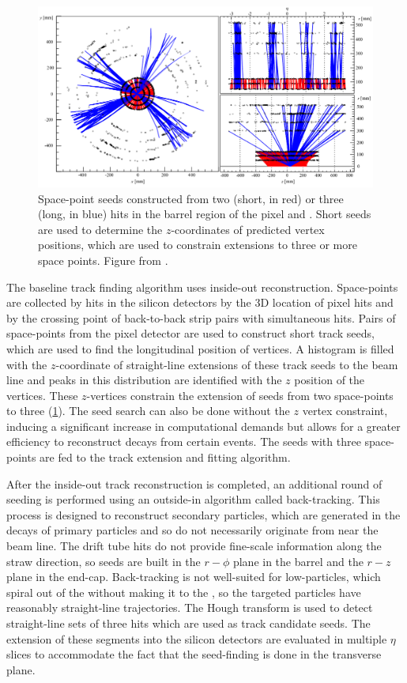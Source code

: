 \begin{figure}[t]
  \includegraphics[width=\linewidth]{soft-pub-2007-007_sp_seeds.png}
  \caption{Space-point seeds constructed from two (short, in red) or three (long, in blue) hits in the barrel region of the pixel and \sct. Short seeds are used to determine the $z$-coordinates of predicted vertex positions, which are used to constrain extensions to three or more space points.  Figure from .}
  \label{fig:trk_seeds}
\end{figure}

The baseline track finding algorithm uses inside-out reconstruction.
Space-points are collected by hits in the silicon detectors by the 3D location of pixel hits and by the crossing point of back-to-back \sct strip pairs with simultaneous hits.
Pairs of space-points from the pixel detector are used to construct short track seeds, which are used to find the longitudinal position of vertices.
A histogram is filled with the $z$-coordinate of straight-line extensions of these track seeds to the beam line and peaks in this distribution are identified with the $z$ position of the vertices.
These $z$-vertices constrain the extension of seeds from two space-points to three (\cref{fig:trk_seeds}).
The seed search can also be done without the $z$ vertex constraint, inducing a significant increase in computational demands but allows for a greater efficiency to reconstruct decays from certain events.
The seeds with three space-points are fed to the track extension and fitting algorithm.

After the inside-out track reconstruction is completed, an additional round of seeding is performed using an outside-in algorithm called back-tracking.
This process is designed to reconstruct secondary particles, which are generated in the decays of primary particles and so do not necessarily originate from near the beam line.
The \trt drift tube hits do not provide fine-scale information along the straw direction, so seeds are built in the $r - \phi$ plane in the \trt barrel and the $r - z$ plane in the \trt end-cap.
Back-tracking is not well-suited for low-\pt particles, which spiral out of the \id without making it to the \trt, so the targeted particles have reasonably straight-line trajectories.
The Hough transform \cite{Duda:1972:UHT:361237.361242} is used to detect straight-line sets of three \trt hits which are used as track candidate seeds.
The extension of these \trt segments into the silicon detectors are evaluated in multiple $\eta$ slices to accommodate the fact that the seed-finding is done in the transverse plane.


